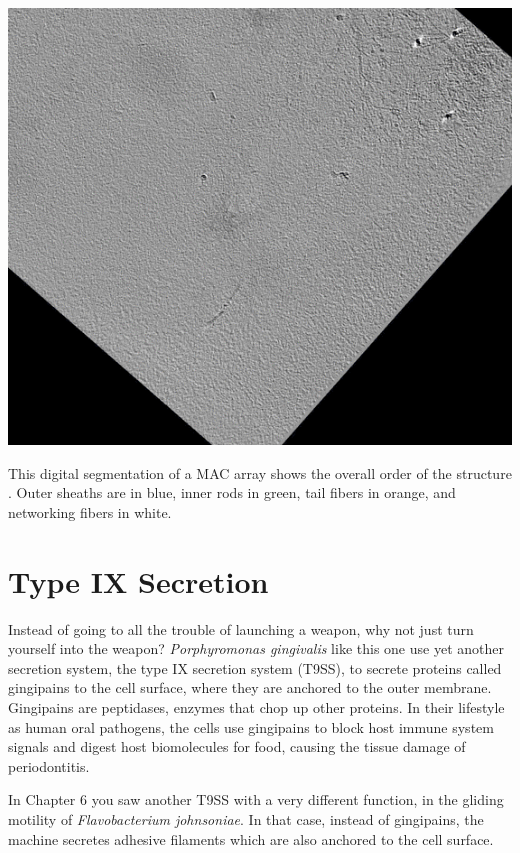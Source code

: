 \documentclass[]{tufte-book}
\begin{document}
\includegraphics{img/schematics/9_7_2}

This digital segmentation of a MAC array shows the overall order of the structure \citep{shikuma2014}. Outer sheaths are in blue, inner rods in green, tail fibers in orange, and networking fibers in white.

\hypertarget{type-ix-secretion}{%
\section{Type IX Secretion}\label{type-ix-secretion}}

Instead of going to all the trouble of launching a weapon, why not just turn yourself into the weapon? \emph{Porphyromonas gingivalis} like this one use yet another secretion system, the type IX secretion system (T9SS), to secrete proteins called gingipains to the cell surface, where they are anchored to the outer membrane. Gingipains are peptidases, enzymes that chop up other proteins. In their lifestyle as human oral pathogens, the cells use gingipains to block host immune system signals and digest host biomolecules for food, causing the tissue damage of periodontitis.

In Chapter 6 you saw another T9SS with a very different function, in the gliding motility of \emph{Flavobacterium johnsoniae}. In that case, instead of gingipains, the machine secretes adhesive filaments which are also anchored to the cell surface.
\end{document}
